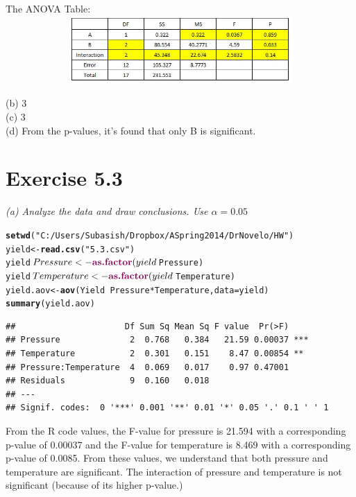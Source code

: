 \documentclass[a4paper]{article}\usepackage{graphicx, color}
\makeatletter
\newcommand{\hlfunctioncall}[1]{\textcolor[rgb]{0.501960784313725,0,0.329411764705882}{\textbf{#1}}}%
\newcommand{\hlstring}[1]{\textcolor[rgb]{0.6,0.6,1}{#1}}%
\newenvironment{kframe}{%
 \def\at@end@of@kframe{}%
 \ifinner\ifhmode%
  \def\at@end@of@kframe{\end{minipage}}%
  \begin{minipage}{\columnwidth}%
 \fi\fi%
 \def\FrameCommand##1{\hskip\@totalleftmargin \hskip-\fboxsep
 \colorbox{shadecolor}{##1}\hskip-\fboxsep
     \hskip-\linewidth \hskip-\@totalleftmargin \hskip\columnwidth}%
 \MakeFramed {\advance\hsize-\width
   \@totalleftmargin\z@ \linewidth\hsize
   \@setminipage}}%
 {\par\unskip\endMakeFramed%
 \at@end@of@kframe}
\newenvironment{knitrout}{}{} %
\makeatother
\begin{document}
\vspace{2 mm}
\raggedright{The ANOVA Table:}\\
\vspace{2 mm}
\includegraphics[width=140mm, height=26mm]{fig2.jpg}
\vspace{2 mm}

(b) 3 \\
(c) 3 \\
(d) From the p-values, it's found that only B is significant. \\

\section{ Exercise 5.3}
\textit{(a) Analyze the data and draw conclusions. Use  $\alpha = 0.05$} \\
\begin{knitrout}
\color{fgcolor}\begin{kframe}
\begin{alltt}
\hlfunctioncall{setwd}(\hlstring{"C:/Users/Subasish/Dropbox/A Spring 2014/Dr Novelo/HW"})
yield <- \hlfunctioncall{read.csv}(\hlstring{"5.3.csv"})
yield$Pressure <- \hlfunctioncall{as.factor}(yield$Pressure)
yield$Temperature <- \hlfunctioncall{as.factor}(yield$Temperature)
yield.aov <- \hlfunctioncall{aov}(Yield ~ Pressure * Temperature, data = yield)
\hlfunctioncall{summary}(yield.aov)
\end{alltt}
\begin{verbatim}
##                      Df Sum Sq Mean Sq F value  Pr(>F)    
## Pressure              2  0.768   0.384   21.59 0.00037 ***
## Temperature           2  0.301   0.151    8.47 0.00854 ** 
## Pressure:Temperature  4  0.069   0.017    0.97 0.47001    
## Residuals             9  0.160   0.018                    
## ---
## Signif. codes:  0 '***' 0.001 '**' 0.01 '*' 0.05 '.' 0.1 ' ' 1
\end{verbatim}
\end{kframe}
\end{knitrout}

From the R code values, the F-value for pressure is 21.594 with a corresponding p-value of 0.00037 and the F-value for temperature is 8.469 with a corresponding p-value of 0.0085. From these values, we understand that both pressure and temperature are significant. The interaction of pressure and temperature is not significant (because of its higher p-value.) \\
\end{document}
